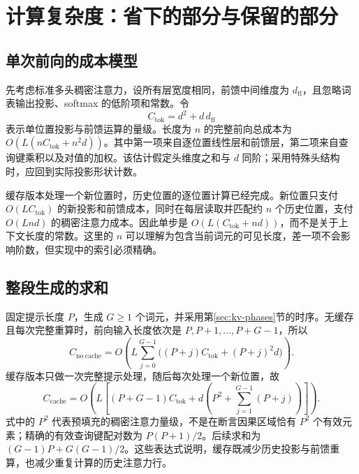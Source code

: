 \documentclass[UTF8,12pt,a4paper,fontset=fandol]{ctexart}
\begin{document}
\section{计算复杂度：省下的部分与保留的部分}
\label{sec:kv-complexity}

\subsection{单次前向的成本模型}

先考虑标准多头稠密注意力，设所有层宽度相同，前馈中间维度为 $d_{\mathrm{ff}}$，且忽略词表输出投影、softmax 的低阶项和常数。令
\begin{equation}
 C_{\mathrm{tok}}=d^2+d\,d_{\mathrm{ff}}
 \label{eq:kv-token-cost}
\end{equation}
表示单位置投影与前馈运算的量级。长度为 $n$ 的完整前向总成本为 $O(L(nC_{\mathrm{tok}}+n^2d))$。其中第一项来自逐位置线性层和前馈层，第二项来自查询键乘积以及对值的加权。该估计假定头维度之和与 $d$ 同阶；采用特殊头结构时，应回到实际投影形状计数。

缓存版本处理一个新位置时，历史位置的逐位置计算已经完成。新位置只支付 $O(LC_{\mathrm{tok}})$ 的新投影和前馈成本，同时在每层读取并匹配约 $n$ 个历史位置，支付 $O(Lnd)$ 的稠密注意力成本。因此单步是 $O(L(C_{\mathrm{tok}}+nd))$，而不是关于上下文长度的常数。这里的 $n$ 可以理解为包含当前词元的可见长度，差一项不会影响阶数，但实现中的索引必须精确。

\subsection{整段生成的求和}

固定提示长度 $P$，生成 $G\geq1$ 个词元，并采用第\ref{sec:kv-phases}节的时序。无缓存且每次完整重算时，前向输入长度依次是 $P,P+1,\ldots,P+G-1$，所以
\begin{equation}
 C_{\mathrm{no\ cache}}=
 O\left(L\sum_{j=0}^{G-1}
 \bigl((P+j)C_{\mathrm{tok}}+(P+j)^2d\bigr)\right).
 \label{eq:kv-nocache-cost}
\end{equation}
缓存版本只做一次完整提示处理，随后每次处理一个新位置，故
\begin{equation}
 C_{\mathrm{cache}}=O\left(L\left[
 (P+G-1)C_{\mathrm{tok}}+
 d\left(P^2+\sum_{j=1}^{G-1}(P+j)\right)\right]\right).
 \label{eq:kv-cache-cost}
\end{equation}
式中的 $P^2$ 代表预填充的稠密注意力量级，不是在断言因果区域恰有 $P^2$ 个有效元素；精确的有效查询键配对数为 $P(P+1)/2$。后续求和为 $(G-1)P+G(G-1)/2$。这些表达式说明，缓存既减少历史投影与前馈重算，也减少重复计算的历史注意力行。
\end{document}
